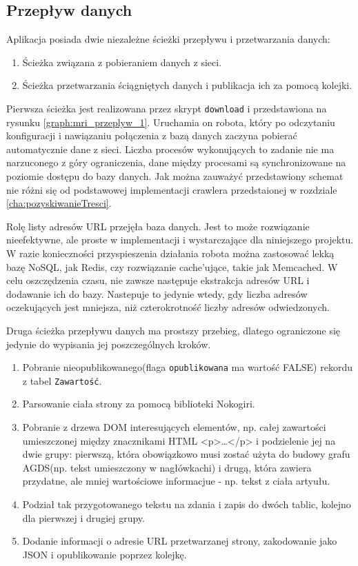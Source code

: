 \subsection{Przepływ danych}
\label{subs:przepDanych}

Aplikacja posiada dwie niezależne ścieżki przepływu i przetwarzania danych:
\begin{enumerate}
\item Ścieżka związana z pobieraniem danych z sieci.
\item Ścieżka przetwarzania ściągniętych danych i publikacja ich za pomocą kolejki.
\end{enumerate}

Pierwsza ścieżka jest realizowana przez skrypt \texttt{download} i przedstawiona na rysunku \ref{graph:mri_przeplyw_1}. Uruchamia on robota, który po odczytaniu konfiguracji i nawiązaniu połączenia z bazą danych zaczyna pobierać
automatycznie dane z sieci.  Liczba procesów wykonujących to zadanie nie ma narzuconego z góry ograniczenia, dane między procesami są synchronizowane na poziomie dostępu do bazy danych.
Jak można zauważyć przedstawiony schemat nie różni się od podstawowej implementacji crawlera przedstaionej w rozdziale \ref{cha:pozyskiwanieTresci}.


Rolę listy adresów URL przejęła baza danych. Jest to może rozwiązanie nieefektywne, ale proste w implementacji i wystarczające dla niniejszego projektu.
W razie konieczności przyspieszenia działania robota można zastosować lekką bazę NoSQL, jak Redis, czy rozwiązanie cache'ujące, takie jak Memcached.
W celu oszczędzenia czasu, nie zawsze następuje ekstrakcja adresów URL i dodawanie ich do bazy. Nastepuje to jedynie wtedy, gdy liczba adresów oczekujących
jest mniejsza, niż czterokrotność liczby adresów odwiedzonych. 

Druga ścieżka przepływu danych ma prostszy przebieg, dlatego ograniczone się jedynie do wypisania jej poszczególnych kroków.
\begin{enumerate}
\item Pobranie nieopublikowanego(flaga \texttt{opublikowana} ma wartość FALSE) rekordu z tabel \texttt{Zawartość}.
\item Parsowanie ciała strony za pomocą biblioteki Nokogiri.
\item Pobranie z drzewa DOM interesujących elementów, np. całej zawartości umieszczonej między znacznikami HTML <p>\dots</p> i podzielenie jej na dwie grupy: pierwszą, która
obowiązkowo musi zostać użyta do budowy grafu AGDS(np. tekst umieszczony w nagłówkachi) i drugą, która zawiera przydatne, ale mniej wartościowe informacjue - np. tekst z ciała artyułu.
\item Podział tak przygotowanego tekstu na zdania i zapis do dwóch tablic, kolejno dla pierwszej i drugiej grupy.
\item Dodanie informacji o adresie URL przetwarzanej strony, zakodowanie jako JSON i opublikowanie poprzez kolejkę.
\end{enumerate}


